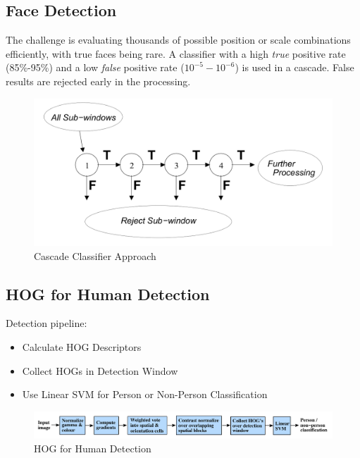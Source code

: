 \subsection{Face Detection}
The challenge is evaluating thousands of possible position or scale combinations efficiently, with true faces being rare.
A classifier with a high \emph{true} positive rate (85\%-95\%) and a low \emph{false} positive rate ($10^{-5}-10^{-6}$) is used in a cascade.
False results are rejected early in the processing.

\begin{figure}[h]
	\centering
	\includegraphics[width=0.6\linewidth]{img/cascade_classifier_approach}
	\caption{Cascade Classifier Approach}
\end{figure}

\subsection{HOG for Human Detection}
Detection pipeline:
\begin{itemize}
	\item Calculate HOG Descriptors
	\item Collect HOGs in Detection Window
	\item Use Linear SVM for Person or Non-Person Classification
\end{itemize}

\begin{figure}[h]
	\centering
	\includegraphics[width=0.8\linewidth]{img/hog_human_detection}
	\caption{HOG for Human Detection}
\end{figure}

